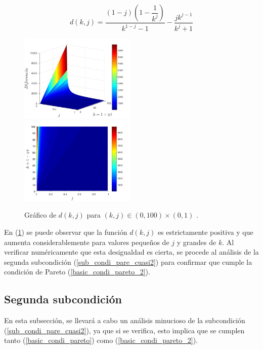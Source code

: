 $$d(k,j) = \dfrac{(1-j) \left(1 - \dfrac{1}{k^j}\right)}{k^{1-j}-1} - \dfrac{j k^{j-1}}{k^j+1}$$
\begin{figure}[!h]
\begin{center}
\includegraphics[width=0.495\textwidth]{5_Capitulo5/Graficos/Fig1.jpg}
\includegraphics[width=0.495\textwidth]{5_Capitulo5/Graficos/Fig2.jpg}
\caption{Gráfico de $d(k,j)$ para $(k,j) \in (0,100) \times  (0,1)$ .}
\label{fig_diferencia}
\end{center}
\end{figure}

En (\ref{fig_diferencia}) se puede observar que la función $d(k,j)$ es estrictamente positiva y que aumenta considerablemente para valores pequeños de $j$ y grandes de $k$.
Al verificar numéricamente que esta desigualdad es cierta, se procede al análisis de la segunda subcondición (\ref{sub_condi_pare_cuasi2}) para confirmar que  cumple la condición de Pareto (\ref{basic_condi_pareto_2}).

\subsection{Segunda subcondición}
En esta subsección, se llevará a cabo un análisis minucioso de la subcondición (\ref{sub_condi_pare_cuasi2}), ya que si se verifica, esto implica que se cumplen tanto (\ref{basic_condi_pareto}) como (\ref{basic_condi_pareto_2}).

